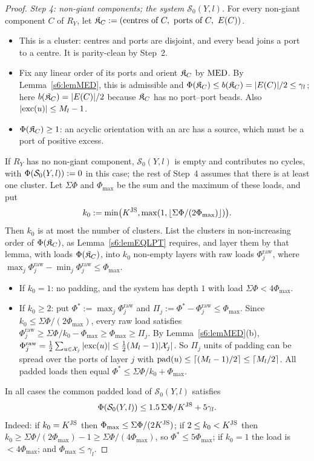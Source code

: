 \begin{proof}
\emph{Step 4: non-giant components; the system $\mathcal S_0(Y,l)$.} For every non-giant component $C$ of $R_Y$, let $\clu_C:=(\text{centres of }C,\ \text{ports of }C,\ E(C))$.
\begin{itemize}
\item This is a cluster: centres and ports are disjoint, and every bead joins a port to a centre. It is parity-clean by Step~2.
\item Fix any linear order of its ports and orient $\mathfrak{K}_C$ by $\mathrm{MED}$. By Lemma~\ref{s6:lemMED}, this is admissible and $\Phi(\mathfrak{K}_C)\le b(\mathfrak{K}_C)=|E(C)|/2\le\gamma_l$; here $b(\mathfrak{K}_C)=|E(C)|/2$ because $\mathfrak{K}_C$ has no port--port beads. Also $|\mathrm{exc}(u)|\le M_l-1$.
\item $\Phi(\mathfrak{K}_C)\ge1$: an acyclic orientation with an arc has a source, which must be a port of positive excess.
\end{itemize}
If $R_Y$ has no non-giant component, $\mathcal S_0(Y,l)$ is empty and contributes no cycles, with $\Phi(\mathcal S_0(Y,l))\mathrel{:=}0$ in this case; the rest of Step~4 assumes that there is at least one cluster.
Let $\Sigma\Phi$ and $\Phi_{\max}$ be the sum and the maximum of these loads, and put
\[
k_0:=\min\bigl(K^{\mathrm{JS}},\max(1,\lfloor\Sigma\Phi/(2\Phi_{\max})\rfloor)\bigr).
\]
Then $k_0$ is at most the number of clusters. List the clusters in non-increasing order of $\Phi(\mathfrak{K}_C)$, as Lemma~\ref{s6:lemEQLPT} requires, and layer them by that lemma, with loads $\Phi(\mathfrak{K}_C)$, into $k_0$ non-empty layers with raw loads $\Phi^{\mathrm{raw}}_j$, where $\max_j\Phi^{\mathrm{raw}}_j-\min_j\Phi^{\mathrm{raw}}_j\le\Phi_{\max}$.
\begin{itemize}
\item If $k_0=1$: no padding, and the system has depth $1$ with load $\Sigma\Phi<4\Phi_{\max}$.
\item If $k_0\ge2$: put $\Phi^*:=\max_j\Phi^{\mathrm{raw}}_j$ and $\Pi_j:=\Phi^*-\Phi^{\mathrm{raw}}_j\le\Phi_{\max}$. Since $k_0\le\Sigma\Phi/(2\Phi_{\max})$, every raw load satisfies $\Phi^{\mathrm{raw}}_j\ge\Sigma\Phi/k_0-\Phi_{\max}\ge\Phi_{\max}\ge\Pi_j$. By Lemma~\ref{s6:lemMED}(b), $\Phi^{\mathrm{raw}}_j=\frac12\sum_{u\in\mathcal{X}_j}|\mathrm{exc}(u)|\le\frac12(M_l-1)|\mathcal{X}_j|$. So $\Pi_j$ units of padding can be spread over the ports of layer $j$ with $\mathrm{pad}(u)\le\lceil(M_l-1)/2\rceil\le\lceil M_l/2\rceil$. All padded loads then equal $\Phi^*\le\Sigma\Phi/k_0+\Phi_{\max}$.
\end{itemize}
In all cases the common padded load of $\mathcal S_0(Y,l)$ satisfies
\begin{equation}\label{s6:eqSzeroCost}
\Phi(\mathcal S_0(Y,l))\le1.5\,\Sigma\Phi/K^{\mathrm{JS}}+5\gamma_l.
\end{equation}
Indeed: if $k_0=K^{\mathrm{JS}}$ then $\Phi_{\max}\le\Sigma\Phi/(2K^{\mathrm{JS}})$; if $2\le k_0<K^{\mathrm{JS}}$ then $k_0\ge\Sigma\Phi/(2\Phi_{\max})-1\ge\Sigma\Phi/(4\Phi_{\max})$, so $\Phi^*\le5\Phi_{\max}$; if $k_0=1$ the load is $<4\Phi_{\max}$; and $\Phi_{\max}\le\gamma_l$.


\end{proof}
